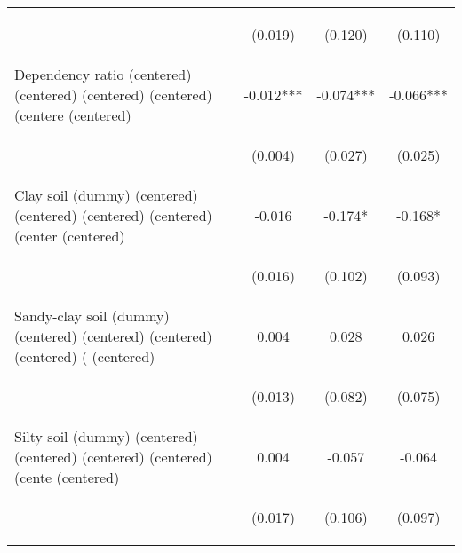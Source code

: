 \begin{center}
\begin{tabular}{lccc}
\vspace{4pt} & \begin{footnotesize}(0.019)\end{footnotesize} & \begin{footnotesize}(0.120)\end{footnotesize} & \begin{footnotesize}(0.110)\end{footnotesize} \\
Dependency ratio (centered) (centered) (centered) (centered) (centere (centered) & -0.012*** & -0.074*** & -0.066*** \\
\vspace{4pt} & \begin{footnotesize}(0.004)\end{footnotesize} & \begin{footnotesize}(0.027)\end{footnotesize} & \begin{footnotesize}(0.025)\end{footnotesize} \\
Clay soil (dummy) (centered) (centered) (centered) (centered) (center (centered) & -0.016 & -0.174* & -0.168* \\
\vspace{4pt} & \begin{footnotesize}(0.016)\end{footnotesize} & \begin{footnotesize}(0.102)\end{footnotesize} & \begin{footnotesize}(0.093)\end{footnotesize} \\
Sandy-clay soil (dummy) (centered) (centered) (centered) (centered) ( (centered) & 0.004 & 0.028 & 0.026 \\
\vspace{4pt} & \begin{footnotesize}(0.013)\end{footnotesize} & \begin{footnotesize}(0.082)\end{footnotesize} & \begin{footnotesize}(0.075)\end{footnotesize} \\
Silty soil (dummy) (centered) (centered) (centered) (centered) (cente (centered) & 0.004 & -0.057 & -0.064 \\
\vspace{4pt} & \begin{footnotesize}(0.017)\end{footnotesize} & \begin{footnotesize}(0.106)\end{footnotesize} & \begin{footnotesize}(0.097)\end{footnotesize} \\

\end{tabular}
\end{center}
